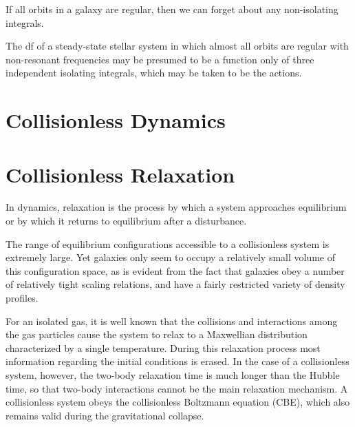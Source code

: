 \documentclass[12pt,a4paper]{article}
\newcounter{theo}[section]\setcounter{theo}{0}
\begin{document}
If all orbits in a galaxy are regular, then we can forget about any non-isolating integrals.
\begin{tcolorbox}[colback=green!5,colframe=green!40!black,title=Strong Jeans theorem]
The df of a steady-state stellar system in which almost all orbits are regular with non-resonant frequencies may be presumed to be a function only of three independent isolating integrals, which may be taken to be the actions.
\end{tcolorbox}




\section{Collisionless Dynamics}
\cite{2010gfe..book.....M}


\section{Collisionless Relaxation}
\cite{2010gfe..book.....M} In dynamics, relaxation is the process by which a system approaches equilibrium or by which it returns to equilibrium after a disturbance. 

The range of equilibrium configurations accessible to a collisionless system is extremely large. Yet galaxies only seem to occupy a relatively small volume of this configuration space, as is evident from the fact that galaxies obey a number of relatively tight scaling relations, and have a fairly restricted variety of density profiles. 

For an isolated gas, it is well known that the collisions and interactions among the gas particles cause the system to relax to a Maxwellian distribution characterized by a single temperature. During this relaxation process most information regarding the initial conditions is erased. In the case of a collisionless system, however, the two-body relaxation time is much longer than the Hubble time, so that two-body interactions cannot be the main relaxation mechanism. A collisionless system obeys the collisionless Boltzmann equation (CBE), which also remains valid during the gravitational collapse.
\end{document}
